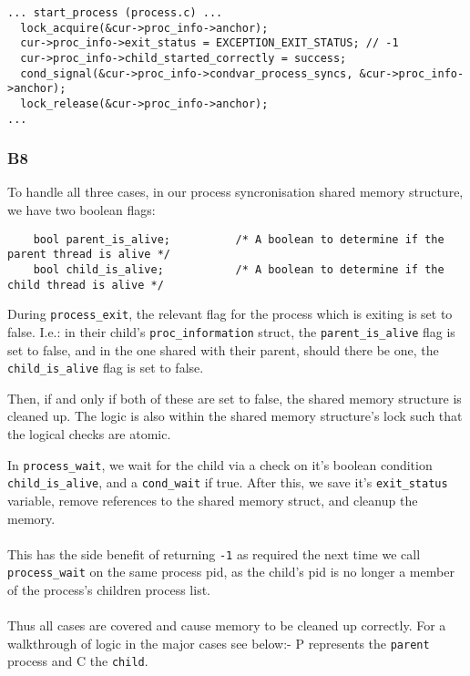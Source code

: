 \documentclass[a4wide, 11pt]{article}
\newcommand{\tx}{\texttt}
\begin{document}
\begin{verbatim}
... start_process (process.c) ...
  lock_acquire(&cur->proc_info->anchor);
  cur->proc_info->exit_status = EXCEPTION_EXIT_STATUS; // -1
  cur->proc_info->child_started_correctly = success;
  cond_signal(&cur->proc_info->condvar_process_syncs, &cur->proc_info->anchor);
  lock_release(&cur->proc_info->anchor);
...
\end{verbatim}

\subsubsection{B8}

To handle all three cases, in our process syncronisation shared memory structure, we have two boolean flags:

\begin{verbatim}
    bool parent_is_alive;          /* A boolean to determine if the parent thread is alive */
    bool child_is_alive;           /* A boolean to determine if the child thread is alive */
\end{verbatim}

During \tx{process\_exit}, the relevant flag for the process which is exiting is set to false. I.e.: in their child's \tx{proc\_information} struct, the \tx{parent\_is\_alive} flag is set to false, and in the one shared with their parent, should there be one, the \tx{child\_is\_alive} flag is set to false.

Then, if and only if both of these are set to false, the shared memory structure is cleaned up. The logic is also within the shared memory structure's lock such that the logical checks are atomic.

In \tx{process\_wait}, we wait for the child via a check on it's boolean condition \texttt{child\_is\_alive}, and a \texttt{cond\_wait} if true. After this, we save it's \texttt{exit\_status} variable, remove references to the shared memory struct, and cleanup the memory.
\\\\
This has the side benefit of returning \tx{-1} as required the next time we call \texttt{process\_wait} on the same process pid, as the child's pid is no longer a member of the process's children process list.
\\\\
Thus all cases are covered and cause memory to be cleaned up correctly. For a walkthrough of logic in the major cases see below:- P represents the \texttt{parent} process and C the \texttt{child}.
\end{document}
